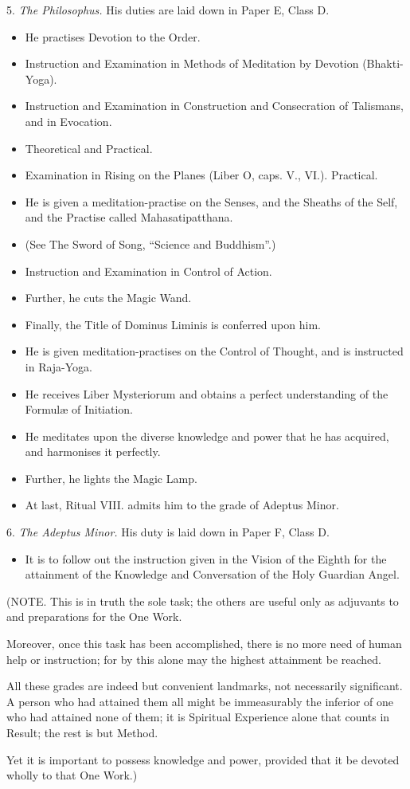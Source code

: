 5. \textit{The Philosophus.} His duties are laid down in Paper E, Class D.
\begin{itemize}
\item He practises Devotion to the Order.
\item Instruction and Examination in Methods of Meditation by Devotion (Bhakti-Yoga).
\item Instruction and Examination in Construction and Consecration of Talismans, and in Evocation.
\item Theoretical and Practical.
\item Examination in Rising on the Planes (Liber O, caps. V., VI.). Practical.
\item He is given a meditation-practise on the Senses, and the Sheaths of the Self, and the Practise called Mahasatipatthana.
\item (See The Sword of Song, \enquote{Science and Buddhism}.)
\item Instruction and Examination in Control of Action.
\item Further, he cuts the Magic Wand.
\item Finally, the Title of Dominus Liminis is conferred upon him.
\item He is given meditation-practises on the Control of Thought, and is instructed in Raja-Yoga.
\item He receives Liber Mysteriorum and obtains a perfect understanding of the Formul\ae{} of Initiation.
\item He meditates upon the diverse knowledge and power that he has acquired, and harmonises it perfectly.
\item Further, he lights the Magic Lamp.
\item At last, Ritual VIII. admits him to the grade of Adeptus Minor.
\end{itemize}

6. \textit{The Adeptus Minor.} His duty is laid down in Paper F, Class D.
\begin{itemize}[label={}]
\item It is to follow out the instruction given in the Vision of the Eighth \AEthyr{} for the attainment of the Knowledge and Conversation of the Holy Guardian Angel.
\end{itemize}

(NOTE. This is in truth the sole task; the others are useful only as adjuvants to and preparations for the One Work.

Moreover, once this task has been accomplished, there is no more need of human help or instruction; for by this alone may the highest attainment be reached.

All these grades are indeed but convenient landmarks, not necessarily significant. A person who had attained them all might be immeasurably the inferior of one who had attained none of them; it is Spiritual Experience alone that counts in Result; the rest is but Method.

Yet it is important to possess knowledge and power, provided that it be devoted wholly to that One Work.) 

